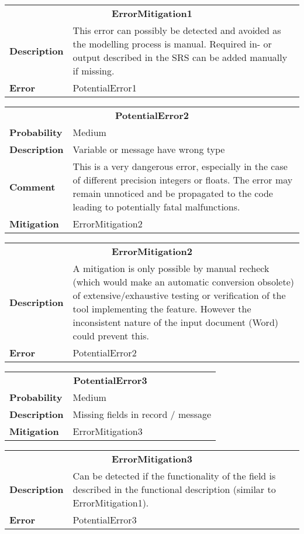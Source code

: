 \begin{tabular}{|lp{}|}
\hline
\multicolumn{2}{|c|}{\bf ErrorMitigation1}\\
\bf Description&This error can possibly be detected and avoided as the modelling process is manual. Required in- or output described in the SRS can be added manually if missing.\\
\bf Error&PotentialError1\\
\hline
\end{tabular}

\begin{tabular}{|lp{}|}
\hline
\multicolumn{2}{|c|}{\bf PotentialError2}\\
\bf Probability&Medium\\
\bf Description&Variable or message have wrong type\\
\bf Comment&This is a very dangerous error, especially in the case of different precision integers or floats. The error may
                                       remain unnoticed and be propagated to the code leading to potentially fatal malfunctions.\\
\bf Mitigation&ErrorMitigation2\\
\hline
\end{tabular}

\begin{tabular}{|lp{}|}
\hline
\multicolumn{2}{|c|}{\bf ErrorMitigation2}\\
\bf Description&A mitigation is only possible by manual recheck (which would make an automatic conversion obsolete) of extensive/exhaustive testing or verification of the tool implementing the feature. However the inconsistent nature of the input document (Word) could prevent this.\\
\bf Error&PotentialError2\\
\hline
\end{tabular}

\begin{tabular}{|lp{}|}
\hline
\multicolumn{2}{|c|}{\bf PotentialError3}\\
\bf Probability&Medium\\
\bf Description&Missing fields in record / message\\
\bf Mitigation&ErrorMitigation3\\
\hline
\end{tabular}

\begin{tabular}{|lp{}|}
\hline
\multicolumn{2}{|c|}{\bf ErrorMitigation3}\\
\bf Description&Can be detected if the functionality of the field is described in the functional description (similar to ErrorMitigation1).\\
\bf Error&PotentialError3\\
\hline
\end{tabular}

